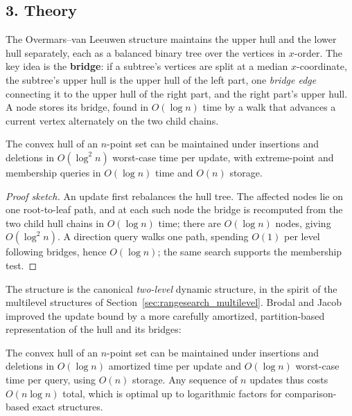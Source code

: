 \subsection{3. Theory}

The Overmars--van Leeuwen structure maintains the upper hull and the lower
hull separately, each as a balanced binary tree over the vertices in
$x$-order. The key idea is the \textbf{bridge}: if a subtree's
vertices are split at a median $x$-coordinate, the subtree's upper hull is
the upper hull of the left part, one \emph{bridge edge} connecting it to the
upper hull of the right part, and the right part's upper hull. A node stores
its bridge, found in $O(\log n)$ time by a walk that advances a current
vertex alternately on the two child chains.

\begin{theorem}\label{thm:dyn_hull_overmars}
  The convex hull of an $n$-point set can be maintained under insertions and
  deletions in $O(\log^2 n)$ worst-case time per update, with extreme-point
  and membership queries in $O(\log n)$ time and $O(n)$ storage.
\end{theorem}

\begin{proof}[Proof sketch]
  An update first rebalances the hull tree. The affected nodes lie on one
  root-to-leaf path, and at each such node the bridge is recomputed from the
  two child hull chains in $O(\log n)$ time; there are $O(\log n)$ nodes,
  giving $O(\log^2 n)$. A direction query walks one path, spending $O(1)$
  per level following bridges, hence $O(\log n)$; the same search supports
  the membership test.
\end{proof}

The structure is the canonical \emph{two-level} dynamic structure, in the
spirit of the multilevel structures of
Section~\ref{sec:rangesearch_multilevel}. Brodal and Jacob \cite{brodal2002}
improved the update bound by a more carefully amortized, partition-based
representation of the hull and its bridges:

\begin{theorem}\label{thm:dyn_hull_brodal}
  The convex hull of an $n$-point set can be maintained under insertions and
  deletions in $O(\log n)$ amortized time per update and $O(\log n)$
  worst-case time per query, using $O(n)$ storage. Any sequence of $n$
  updates thus costs $O(n\log n)$ total, which is optimal up to logarithmic
  factors for comparison-based exact structures.
\end{theorem}

